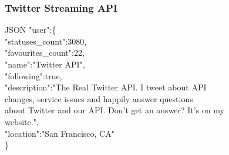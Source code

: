 \begin{frame}
	\frametitle{Twitter Streaming API}
	\begin{block}{JSON}
		"user":\{\\
		\quad "statuses\_count":3080,\\
		\quad "favourites\_count":22,\\
		\quad "name":"Twitter API",\\
		\quad "following":true,\\
		\quad "description":"The Real Twitter API. I tweet about API \\ \quad changes, service issues and happily answer questions\\ \quad  about Twitter and our API. Don't get an answer? It's on my \\ \quad website.",\\
		\quad "location":"San Francisco, CA"\\
		\}
	\end{block}
\end{frame}